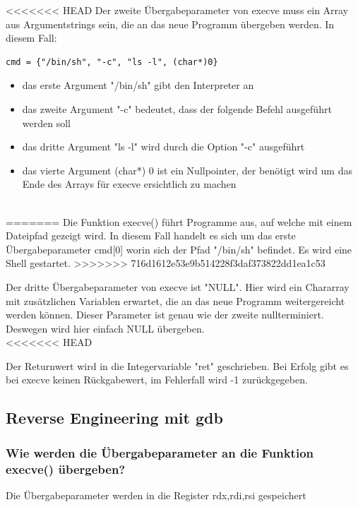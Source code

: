 \documentclass[12pt]{article}
\begin{document}
<<<<<<< HEAD
			Der zweite \"Ubergabeparameter von execve muss ein Array aus Argumentstrings sein, die an das neue Programm \"ubergeben werden. In diesem Fall:

			\begin{lstlisting}
cmd = {"/bin/sh", "-c", "ls -l", (char*)0}
			\end{lstlisting}
			\begin{itemize}
			\item das erste Argument "/bin/sh" gibt den Interpreter an\\
			\item das zweite Argument "-c" bedeutet, dass der folgende Befehl ausgef\"uhrt werden soll\\
			\item das dritte Argument "ls -l" wird durch die Option "-c" ausgef\"uhrt\\
			\item das vierte Argument (char*) 0 ist ein Nullpointer, der ben\"otigt wird um das Ende des Arrays f\"ur execve ersichtlich zu machen
			\end{itemize}
			~\\[0.3cm]
=======
Die Funktion execve() führt Programme aus, auf welche mit einem Dateipfad gezeigt wird.
In diesem Fall handelt es sich um das erste Übergabeparameter cmd[0]
worin sich der Pfad "/bin/sh" befindet. Es wird eine Shell gestartet.
>>>>>>> 716d1612e53e9b514228f3daf373822dd1ea1c53

			Der dritte \"Ubergabeparameter von execve ist "NULL". Hier wird ein Chararray mit zus\"atzlichen Variablen erwartet, die an
das neue Programm weitergereicht werden k\"onnen. Dieser Parameter ist genau wie der zweite nullterminiert. Deswegen wird hier einfach NULL \"ubergeben.\\[0.3cm]

<<<<<<< HEAD

			Der Returnwert wird in die Integervariable "ret" geschrieben. Bei Erfolg gibt es bei execve keinen R\"uckgabewert, im Fehlerfall wird -1 zur\"uckgegeben.

		
\subsection{Reverse Engineering mit gdb}

\subsubsection{Wie werden die Übergabeparameter an die Funktion execve()
übergeben?}
Die Übergabeparameter werden in die Register 
rdx,rdi,rsi gespeichert
\end{document}
